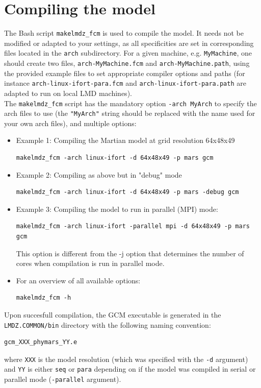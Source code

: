 \section{Compiling the model}
\label{sc:compile}
The Bash script {\tt makelmdz\_fcm} is used to compile the model.
It needs not be modified or adapted to your settings, as all
specificities are set in corresponding files located in the {\tt arch}
subdirectory. For a given machine, e.g. {\tt MyMachine}, one should create
two files, {\tt arch-MyMachine.fcm} and {\tt arch-MyMachine.path}, using the
provided example files to set appropriate compiler options and paths
(for instance {\tt arch-linux-ifort-para.fcm} and
{\tt arch-linux-ifort-para.path} are adapted to run on local LMD machines).\\
The {\tt makelmdz\_fcm} script has the mandatory option {\tt -arch MyArch}
to specify the arch files to use (the {\tt "MyArch"} string should be replaced
with the name used for your own arch files), and multiple options:
\begin{itemize}
\item Example 1: Compiling the Martian model at grid resolution 64x48x49
\begin{verbatim}
makelmdz_fcm -arch linux-ifort -d 64x48x49 -p mars gcm
\end{verbatim}
\item Example 2: Compiling as above but in "debug" mode
\begin{verbatim}
makelmdz_fcm -arch linux-ifort -d 64x48x49 -p mars -debug gcm
\end{verbatim}
\item Example 3: Compiling the model to run in parallel (MPI) mode:
\begin{verbatim}
makelmdz_fcm -arch linux-ifort -parallel mpi -d 64x48x49 -p mars gcm
\end{verbatim}
This option is different from the -j option that determines the number of cores when compilation is run in parallel mode.
\item For an overview of all available options:
\begin{verbatim}
makelmdz_fcm -h
\end{verbatim}
\end{itemize}
Upon succesfull compilation, the GCM executable is generated in the
{\tt LMDZ.COMMON/bin} directory with the following naming convention:
\begin{verbatim}
gcm_XXX_phymars_YY.e
\end{verbatim}
where \verb+XXX+ is the model resolution (which was specified with the {\tt -d} argument) and \verb+YY+ is either \verb+seq+ or \verb+para+ depending on if the model was compiled in serial or parallel mode ({\tt -parallel} argument).

